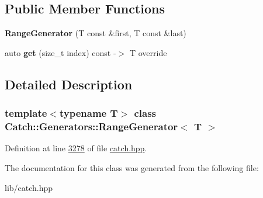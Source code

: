 \subsection*{Public Member Functions}
\begin{DoxyCompactItemize}
\item 
\mbox{\label{classCatch_1_1Generators_1_1RangeGenerator_a56c5fcc855bdb668d7b93c2017a7c44c}} 
{\bfseries Range\+Generator} (T const \&first, T const \&last)
\item 
\mbox{\label{classCatch_1_1Generators_1_1RangeGenerator_a78f7f624b7545823d1a683ebf2ac00e7}} 
auto {\bfseries get} (size\+\_\+t index) const -\/$>$ T override
\end{DoxyCompactItemize}


\subsection{Detailed Description}
\subsubsection*{template$<$typename T$>$\newline
class Catch\+::\+Generators\+::\+Range\+Generator$<$ T $>$}



Definition at line \mbox{\hyperlink{catch_8hpp_source_l03278}{3278}} of file \mbox{\hyperlink{catch_8hpp_source}{catch.\+hpp}}.



The documentation for this class was generated from the following file\+:\begin{DoxyCompactItemize}
\item 
lib/catch.\+hpp\end{DoxyCompactItemize}

